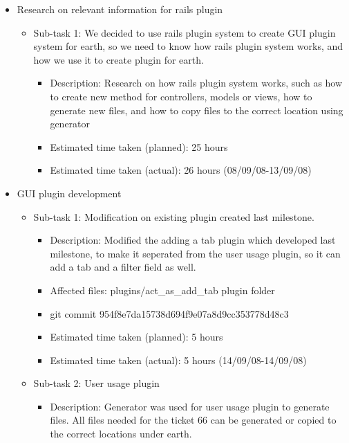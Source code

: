 \documentclass{article}
\begin{document}
\begin{itemize}
    \item Research on relevant information for rails plugin
        \begin{itemize}
            \item Sub-task 1: We decided to use rails plugin system to create GUI plugin system for earth, so we need to know how rails plugin system works, and how we use it to create plugin for earth.
                \begin{itemize}
                    \item Description: Research on how rails plugin system works, such as how to create new method for controllers, models or views, how to generate new files, and how to copy files to the correct location using generator
                    \item Estimated time taken (planned): 25 hours
                    \item Estimated time taken (actual):  26 hours (08/09/08-13/09/08)
                \end{itemize}
        \end{itemize}
    \item GUI plugin development
        \begin{itemize}
            \item Sub-task 1: Modification on existing plugin created last milestone.
                \begin{itemize}
                    \item Description: Modified the adding a tab plugin which developed last milestone, to make it seperated from the user usage plugin, so it can add a tab and a filter field as well.
                    \item Affected files: plugins/act\_as\_add\_tab plugin folder
                    \item git commit 954f8e7da15738d694f9e07a8d9cc353778d48c3
                    \item Estimated time taken (planned): 5 hours
                    \item Estimated time taken (actual): 5 hours (14/09/08-14/09/08)
                \end{itemize}
            \item Sub-task 2: User usage plugin
                \begin{itemize}
                    \item Description: Generator was used for user usage plugin to generate files. All files needed for the ticket 66 can be generated or copied to the correct locations under earth.

\end{itemize}
\end{itemize}
\end{itemize}
\end{document}
